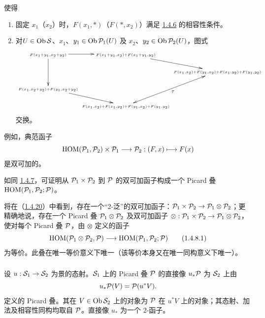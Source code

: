使得

\begin{enumerate} \renewcommand{\theenumi}{\alph{enumi}} \renewcommand{\labelenumi}{\theenumi)} \item 固定 $x_{1}$（\resp $x_{2}$）时，$F(x_{1},\ast)$（\resp $F(\ast,x_{2})$）满足 \hyperref[XVIII.subsubsec1.4.6]{1.4.6} 的相容性条件。

\item 对\pageoriginale $U\in \operatorname{Ob} {\mathcal S}$、$x_{1}$、$y_{1}\in
\operatorname{Ob} {\mathcal P}_{1}(U)$ 及 $x_{2}$、$y_{2}\in \operatorname{Ob} {\mathcal P}_{2}(U)$，图式 $$
\xymatrix@C=0cm@R=.5cm{
\scriptscriptstyle{F(x_1+y_1, x_2+y_2)}\ar[dd] \ar[r] &\scriptscriptstyle{F(x_1+y_1, x_2) + F(x_1+y_1,y_2)}\ar[rd]\\
 & &\scriptscriptstyle{F(x_1,x_2) + F(y_1,x_2) +F(x_1,y_2)+F(y_1,y_2)}\\
\scriptscriptstyle{F(x_1,x_2+y_2) + F(y_1,x_2+y_2)}\ar[rd] \\
& \scriptscriptstyle{F(x_1,x_2)+F(x_1,y_2) + F(y_1,x_2)+F(y_1,y_2)}\ar@{<->}[ruu]_{\tau}
}
$$ 交换。 \end{enumerate}

例如，典范函子 $$
\operatorname{HOM}({\mathcal P}_{1},{\mathcal P}_{2})\times
{\mathcal P}_{1}\longrightarrow {\mathcal P}_{2}:(F,x)\longmapsto F(x)
$$ 是双可加的。

如同 \hyperref[XVIII.subsubsec1.4.7]{1.4.7}，可证明从 ${\mathcal P}_{1}\times {\mathcal P}_{2}$ 到 ${\mathcal P}$ 的双可加函子构成一个 Picard 叠 $\operatorname{HOM}({\mathcal P}_{1}, {\mathcal P}_{2};{\mathcal P})$。

将在（\hyperref[XVIII.const1.4.20]{1.4.20}）中看到，存在一个“$2$-泛”的双可加函子：${\mathcal P}_{1}\times {\mathcal P}_{2}\rightarrow
{\mathcal P}_{1}\otimes {\mathcal P}_{2}$；更精确地说，存在一个 Picard 叠 ${\mathcal P}_{1}\otimes {\mathcal P}_{2}$ 及双可加函子 $\otimes:{\mathcal P}_{1}\times
{\mathcal P}_{2}\rightarrow {\mathcal P}_{1}\otimes {\mathcal P}_{2}$，使对每个 Picard 叠 ${\mathcal P}$，由 $\otimes$ 定义的函子 \begin{equation*}
\operatorname{HOM}({\mathcal P}_{1}\otimes {\mathcal P}_{2},{\mathcal P})\longrightarrow \operatorname{HOM} ({\mathcal P}_{1},{\mathcal P}_{2};{\mathcal P})\tag{1.4.8.1}
\end{equation*} 为等价。此叠在唯一等价意义下唯一（该等价本身又在唯一同构意义下唯一）。

\subsubsection{} 设 $u:{\mathcal S}_{1}\rightarrow {\mathcal S}_{2}$ 为景的态射。${\mathcal S}_{1}$ 上的 Picard 叠 ${\mathcal P}$ 的直接像 $u_{\ast}{\mathcal P}$ 为 ${\mathcal S}_{2}$ 上由 $$
u_{\ast}{\mathcal P}(V)={\mathcal P}(u^{\ast}V){}.
$$ 定义的 Picard 叠。其在 $V\in \operatorname{Ob} {\mathcal S}_{2}$ 上的对象为 ${\mathcal P}$ 在 $u^{\ast}V$ 上的对象；其态射、加法及相容性同构均取自 ${\mathcal P}$。直接像 $u_{\ast}$ 为一个 $2$-函子。

